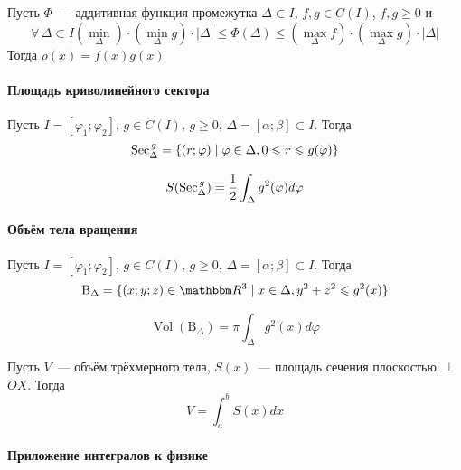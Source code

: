 \documentclass[12pt]{../../notes}
\begin{document}
\begin{stat}\label{stat:denstest3}
  Пусть $\Phi$~--- аддитивная функция промежутка $\Delta \subset I$, $f,g\in C(I)$, $f,g \geqslant 0$ и
  \[
    \forall\, \Delta \subset I \left( \min_\Delta \right) \cdot \left( \min_\Delta g \right) \cdot |\Delta|
    \leqslant \Phi(\Delta) 
    \leqslant \left( \max_\Delta f \right) \cdot \left( \max_\Delta g \right) \cdot |\Delta|
  \] Тогда $\rho(x) = f(x) g(x) $
\end{stat}

\paragraph{Площадь криволинейного сектора}
\def\Sec#1#2{\ensuremath\operatorname{Sec}_{#1}^{\,#2}}
\begin{defn}\label{defn:sector} 
  Пусть $I = [\varphi_1; \varphi_2]$, $g \in C(I)$, $g \geqslant 0$, $\Delta = [\alpha;\beta] \subset I$.
  Тогда
  \[
    \Sec\Delta g = \{(r;\varphi) \mid \varphi \in \Delta, 0 \leqslant r \leqslant g(\varphi)\}
  \]
\end{defn}
\begin{thrm}\label{thrm:secarea}
  \[
    S(\Sec\Delta g) = \frac{1}{2} \int_\Delta g^2(\varphi) d\varphi
  \]
\end{thrm}
\paragraph{Объём тела вращения}

\begin{defn}\label{defn:rotbody} 
  Пусть $I = [\varphi_1; \varphi_2]$, $g \in C(I)$, $g \geqslant 0$, $\Delta = [\alpha;\beta] \subset I$.
  Тогда
  \[
    \mathrm{B}_\Delta = \{(x;y;z)\in \R^3 \mid x \in \Delta, y^2 + z^2 \leqslant g^2(x)\}
  \]
\end{defn} 
\begin{thrm}\label{thrm:rotbodyarea}
  \[
    \operatorname{Vol}(\mathrm{B}_\Delta) = \pi \int_\Delta g^2(x) d\varphi
  \]
\end{thrm}
\begin{thrm}
  Пусть $V$~--- объём трёхмерного тела, $S(x)$~--- площадь сечения плоскостью $\perp$ $OX$. Тогда
  \[
    V = \int_a^b S(x) dx
  \]
\end{thrm}
\paragraph{Приложение интегралов к физике}
\end{document}
